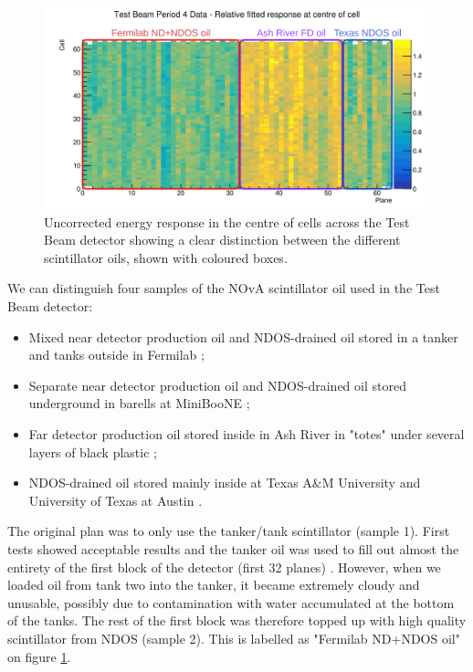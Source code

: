 \documentclass[12pt,a4paper]{article}
\begin{document}

\begin{figure}[!ht]
\centering
\includegraphics[width=\textwidth]{Plots/TestBeamScintillatorOils.png}
\caption{Uncorrected energy response in the centre of cells across the Test Beam detector showing a clear distinction between the different scintillator oils, shown with coloured boxes.}
\label{figScintillators}
\end{figure}

We can distinguish four samples of the NOvA scintillator oil used in the Test Beam detector:
\begin{itemize}
\item Mixed near detector production oil and NDOS-drained oil stored in a tanker and tanks outside in Fermilab \cite{NOVA-doc-38349};
\item Separate near detector production oil and NDOS-drained oil stored underground in barells at MiniBooNE \cite{NOVA-doc-33012};
\item Far detector production oil stored inside in Ash River in "totes" under several layers of black plastic \cite{NOVA-doc-34067};
\item NDOS-drained oil stored mainly inside at Texas A\&M University and University of Texas at Austin \cite{NOVA-doc-38740, NOVA-doc-39088}.
\end{itemize}


The original plan \cite{NOVA-doc-34196} was to only use the tanker/tank scintillator (sample 1). First tests showed acceptable results and the tanker oil was used to fill out almost the entirety of the first block of the detector (first 32 planes) \cite{NOVA-doc-38349}. However, when we loaded oil from tank two into the tanker, it became extremely cloudy and unusable, possibly due to contamination with water accumulated at the bottom of the tanks. The rest of the first block was therefore topped up with high quality scintillator from NDOS (sample 2). This is labelled as "Fermilab ND+NDOS oil" on figure \ref{figScintillators}.
\end{document}
